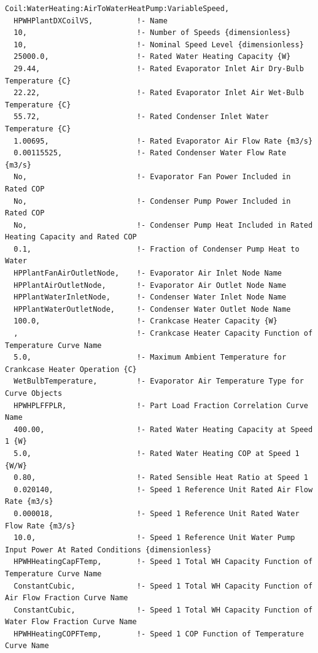 \begin{lstlisting}
Coil:WaterHeating:AirToWaterHeatPump:VariableSpeed,
  HPWHPlantDXCoilVS,          !- Name
  10,                         !- Number of Speeds {dimensionless}
  10,                         !- Nominal Speed Level {dimensionless}
  25000.0,                    !- Rated Water Heating Capacity {W}
  29.44,                      !- Rated Evaporator Inlet Air Dry-Bulb Temperature {C}
  22.22,                      !- Rated Evaporator Inlet Air Wet-Bulb Temperature {C}
  55.72,                      !- Rated Condenser Inlet Water Temperature {C}
  1.00695,                    !- Rated Evaporator Air Flow Rate {m3/s}
  0.00115525,                 !- Rated Condenser Water Flow Rate {m3/s}
  No,                         !- Evaporator Fan Power Included in Rated COP
  No,                         !- Condenser Pump Power Included in Rated COP
  No,                         !- Condenser Pump Heat Included in Rated Heating Capacity and Rated COP
  0.1,                        !- Fraction of Condenser Pump Heat to Water
  HPPlantFanAirOutletNode,    !- Evaporator Air Inlet Node Name
  HPPlantAirOutletNode,       !- Evaporator Air Outlet Node Name
  HPPlantWaterInletNode,      !- Condenser Water Inlet Node Name
  HPPlantWaterOutletNode,     !- Condenser Water Outlet Node Name
  100.0,                      !- Crankcase Heater Capacity {W}
  ,                           !- Crankcase Heater Capacity Function of Temperature Curve Name
  5.0,                        !- Maximum Ambient Temperature for Crankcase Heater Operation {C}
  WetBulbTemperature,         !- Evaporator Air Temperature Type for Curve Objects
  HPWHPLFFPLR,                !- Part Load Fraction Correlation Curve Name
  400.00,                     !- Rated Water Heating Capacity at Speed 1 {W}
  5.0,                        !- Rated Water Heating COP at Speed 1 {W/W}
  0.80,                       !- Rated Sensible Heat Ratio at Speed 1
  0.020140,                   !- Speed 1 Reference Unit Rated Air Flow Rate {m3/s}
  0.000018,                   !- Speed 1 Reference Unit Rated Water Flow Rate {m3/s}
  10.0,                       !- Speed 1 Reference Unit Water Pump Input Power At Rated Conditions {dimensionless}
  HPWHHeatingCapFTemp,        !- Speed 1 Total WH Capacity Function of Temperature Curve Name
  ConstantCubic,              !- Speed 1 Total WH Capacity Function of Air Flow Fraction Curve Name
  ConstantCubic,              !- Speed 1 Total WH Capacity Function of Water Flow Fraction Curve Name
  HPWHHeatingCOPFTemp,        !- Speed 1 COP Function of Temperature Curve Name

\end{lstlisting}
